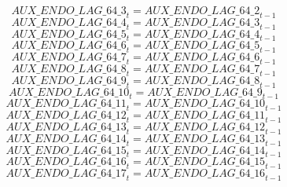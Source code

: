 \begin{dmath}
{AUX\_ENDO\_LAG\_64\_3}_{t}={AUX\_ENDO\_LAG\_64\_2}_{t-1}
\end{dmath}
\begin{dmath}
{AUX\_ENDO\_LAG\_64\_4}_{t}={AUX\_ENDO\_LAG\_64\_3}_{t-1}
\end{dmath}
\begin{dmath}
{AUX\_ENDO\_LAG\_64\_5}_{t}={AUX\_ENDO\_LAG\_64\_4}_{t-1}
\end{dmath}
\begin{dmath}
{AUX\_ENDO\_LAG\_64\_6}_{t}={AUX\_ENDO\_LAG\_64\_5}_{t-1}
\end{dmath}
\begin{dmath}
{AUX\_ENDO\_LAG\_64\_7}_{t}={AUX\_ENDO\_LAG\_64\_6}_{t-1}
\end{dmath}
\begin{dmath}
{AUX\_ENDO\_LAG\_64\_8}_{t}={AUX\_ENDO\_LAG\_64\_7}_{t-1}
\end{dmath}
\begin{dmath}
{AUX\_ENDO\_LAG\_64\_9}_{t}={AUX\_ENDO\_LAG\_64\_8}_{t-1}
\end{dmath}
\begin{dmath}
{AUX\_ENDO\_LAG\_64\_10}_{t}={AUX\_ENDO\_LAG\_64\_9}_{t-1}
\end{dmath}
\begin{dmath}
{AUX\_ENDO\_LAG\_64\_11}_{t}={AUX\_ENDO\_LAG\_64\_10}_{t-1}
\end{dmath}
\begin{dmath}
{AUX\_ENDO\_LAG\_64\_12}_{t}={AUX\_ENDO\_LAG\_64\_11}_{t-1}
\end{dmath}
\begin{dmath}
{AUX\_ENDO\_LAG\_64\_13}_{t}={AUX\_ENDO\_LAG\_64\_12}_{t-1}
\end{dmath}
\begin{dmath}
{AUX\_ENDO\_LAG\_64\_14}_{t}={AUX\_ENDO\_LAG\_64\_13}_{t-1}
\end{dmath}
\begin{dmath}
{AUX\_ENDO\_LAG\_64\_15}_{t}={AUX\_ENDO\_LAG\_64\_14}_{t-1}
\end{dmath}
\begin{dmath}
{AUX\_ENDO\_LAG\_64\_16}_{t}={AUX\_ENDO\_LAG\_64\_15}_{t-1}
\end{dmath}
\begin{dmath}
{AUX\_ENDO\_LAG\_64\_17}_{t}={AUX\_ENDO\_LAG\_64\_16}_{t-1}
\end{dmath}
